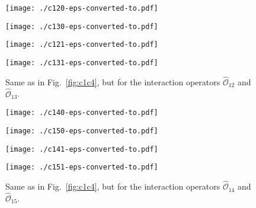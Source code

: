 \documentclass[11pt,a4paper]{article}
\begin{document}
\begin{figure}[t]
\begin{center}
\begin{minipage}[t]{0.49\linewidth}
\centering
\texttt{[image: ./c120-eps-converted-to.pdf]}
\end{minipage}
\begin{minipage}[t]{0.49\linewidth}
\centering
\texttt{[image: ./c130-eps-converted-to.pdf]}
\end{minipage}
\begin{minipage}[t]{0.49\linewidth}
\centering
\texttt{[image: ./c121-eps-converted-to.pdf]}
\end{minipage}
\begin{minipage}[t]{0.49\linewidth}
\centering
\texttt{[image: ./c131-eps-converted-to.pdf]}
\end{minipage}
\end{center}
\caption{Same as in Fig.~\ref{fig:c1c4}, but for the interaction operators $\hat{\mathcal{O}}_{12}$ and $\hat{\mathcal{O}}_{13}$.}
\label{fig:c12c13}
\end{figure}
\begin{figure}[t]
\begin{center}
\begin{minipage}[t]{0.49\linewidth}
\centering
\texttt{[image: ./c140-eps-converted-to.pdf]}
\end{minipage}
\begin{minipage}[t]{0.49\linewidth}
\centering
\texttt{[image: ./c150-eps-converted-to.pdf]}
\end{minipage}
\begin{minipage}[t]{0.49\linewidth}
\centering
\texttt{[image: ./c141-eps-converted-to.pdf]}
\end{minipage}
\begin{minipage}[t]{0.49\linewidth}
\centering
\texttt{[image: ./c151-eps-converted-to.pdf]}
\end{minipage}
\end{center}
\caption{Same as in Fig.~\ref{fig:c1c4}, but for the interaction operators $\hat{\mathcal{O}}_{14}$ and $\hat{\mathcal{O}}_{15}$.}
\label{fig:c14c15}
\end{figure}
\end{document}
